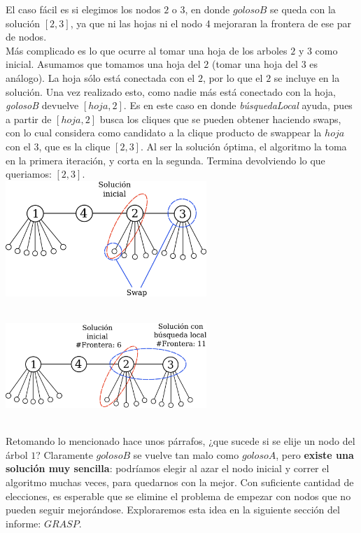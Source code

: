 
El caso fácil es si elegimos los nodos $2$ o $3$, en donde $golosoB$ se queda con la solución $[2,3]$, ya que ni las hojas ni el nodo 4 mejoraran la frontera de ese par de nodos. \\

Más complicado es lo que ocurre al tomar una hoja de los arboles $2$ y $3$ como inicial. Asumamos que tomamos una hoja del $2$ (tomar una hoja del $3$ es análogo). La hoja sólo está conectada con el $2$, por lo que el $2$ se incluye en la solución. Una vez realizado esto, como nadie más está conectado con la hoja, \textit{golosoB} devuelve $[hoja,2]$. Es en este caso en donde \textit{búsquedaLocal} ayuda, pues a partir de $[hoja,2]$ busca los cliques que se pueden obtener haciendo swaps, con lo cual considera como candidato a la clique producto de swappear la $hoja$ con el $3$, que es la clique $[2,3]$. Al ser la solución óptima, el algoritmo la toma en la primera iteración, y corta en la segunda. Termina devolviendo lo que queriamos: $[2,3]$. \\

{\centering
    \includegraphics[width=0.57\textwidth]{informe/imgs/local_base_nodes_v2.png} \\
}
$ $\newline

{\centering
    \includegraphics[width=0.57\textwidth]{informe/imgs/local_base_nodes_v3.png} \\
}
$ $\newline

Retomando lo mencionado hace unos párrafos, ¿que sucede si se elije un nodo del árbol $1$? Claramente $golosoB$ se vuelve tan malo como $golosoA$, pero \textbf{existe una solución muy sencilla}: podríamos elegir al azar el nodo inicial y correr el algoritmo muchas veces, para quedarnos con la mejor. Con suficiente cantidad de elecciones, es esperable que se elimine el problema de empezar con nodos que no pueden seguir mejorándose. Exploraremos esta idea en la siguiente sección del informe: $GRASP$.


